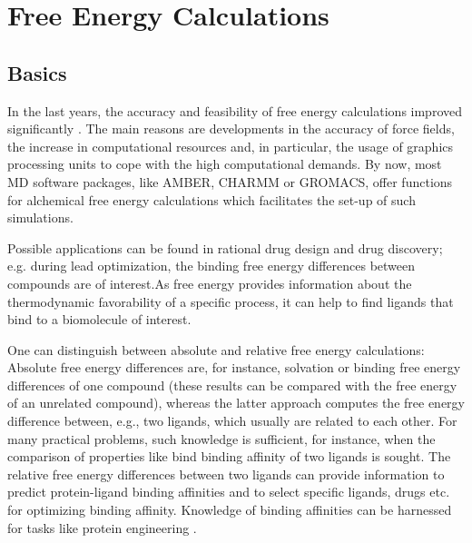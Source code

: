 \chapter{Free Energy Calculations}

\section{Basics}

In the last years, the accuracy and feasibility of free energy calculations
improved significantly \cite{King.2021}. The main reasons are developments
in the accuracy of force fields\cite{Cournia.2017}, the increase
in computational resources and, in particular, the usage of graphics
processing units to cope with the high computational demands. By now,
most MD software packages, like AMBER\cite{DavidA.Case.2005}, CHARMM\cite{Brooks.2009} or GROMACS\cite{Abraham.2015}, offer functions
for alchemical free energy calculations which facilitates the set-up
of such simulations. 

Possible applications can be found in rational drug design and drug
discovery; e.g. during lead optimization, the binding free energy differences
between compounds are of interest.\cite{Cournia.2017}As free energy
provides information about the thermodynamic favorability of a specific
process, it can help to find ligands that bind to a biomolecule of
interest.

One can distinguish between absolute and relative free energy calculations:
Absolute free energy differences are, for instance, solvation or binding
free energy differences of one compound (these results can be compared
with the free energy of an unrelated compound)\cite{Boresch.2003}\cite{Jorgensen.1988},
whereas the latter approach computes the free energy difference between,
e.g., two ligands, which usually are related to each other. For many
practical problems, such knowledge is sufficient, for instance, when
the comparison of properties like bind binding affinity of two ligands
is sought. The relative free energy differences between two ligands
can provide information to predict protein-ligand binding affinities
and to select specific ligands, drugs etc. for optimizing binding
affinity. Knowledge of binding affinities can be harnessed for tasks
like protein engineering \cite{King.2021}.

